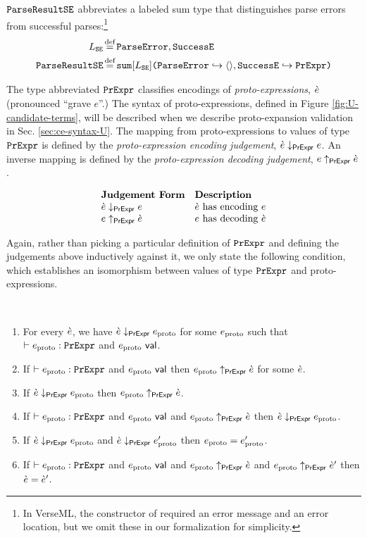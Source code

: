 \begin{enumerate}
$\mathtt{ParseResultSE}$ abbreviates a labeled sum type that distinguishes parse errors from successful parses:\footnote{In VerseML, the  constructor of  required an error message and an error location, but we omit these in our formalization for simplicity.}
\begin{align*}
L_\mathtt{SE} & \defeq \lbltxt{ParseError}, \lbltxt{SuccessE}\\
\tParseResultExp & \defeq \asum{\labelset_\mathtt{SE}}{
  \mapitem{\lbltxt{ParseError}}{\prodt{}}, 
  \mapitem{\lbltxt{SuccessE}}{\tCEExp}
}
\end{align*} %

The type abbreviated $\mathtt{PrExpr}$ classifies encodings of \emph{proto-expressions}, $\grave{e}$ (pronounced ``grave $e$''.) The syntax of proto-expressions, defined in Figure \ref{fig:U-candidate-terms}, will be described when we describe proto-expansion validation in Sec. \ref{sec:ce-syntax-U}. The mapping from proto-expressions to values of type $\mathtt{PrExpr}$ is defined by the \emph{proto-expression encoding judgement}, $\grave{e} \downarrow_\mathsf{PrExpr} e$. An inverse mapping is defined by the \emph{proto-expression decoding judgement}, $e \uparrow_\mathsf{PrExpr} \grave{e}$.

\[\begin{array}{ll}
\textbf{Judgement Form} & \textbf{Description}\\
\grave{e} \downarrow_\mathsf{PrExpr} e & \text{$\grave{e}$ has encoding $e$}\\
e \uparrow_\mathsf{PrExpr} \grave{e} & \text{$e$ has decoding $\grave{e}$}
\end{array}\]

Again, rather than picking a particular definition of $\mathtt{PrExpr}$ and defining the judgements above inductively against it, we only state the following condition, which establishes an isomorphism between values of type $\mathtt{PrExpr}$ and proto-expressions.

\begingroup 
\def\thetheorem{\ref{condition:proto-expression-isomorphism}}
\begin{condition} ~
\begin{enumerate}
\item For every $\grave{e}$, we have $\grave{e} \downarrow_\mathsf{PrExpr} e_\text{proto}$ for some $e_\text{proto}$ such that $\vdash e_\text{proto} : \mathtt{PrExpr}$ and $e_\text{proto}~\mathsf{val}$.
\item If $\vdash e_\text{proto} : \mathtt{PrExpr}$ and $e_\text{proto}~\mathsf{val}$ then $e_\text{proto} \uparrow_\mathsf{PrExpr} \grave{e}$ for some $\grave{e}$.
\item If $\grave{e} \downarrow_\mathsf{PrExpr} e_\text{proto}$ then $e_\text{proto} \uparrow_\mathsf{PrExpr} \grave{e}$.
\item If $\vdash e_\text{proto} : \mathtt{PrExpr}$ and $e_\text{proto}~\mathsf{val}$ and $e_\text{proto} \uparrow_\mathsf{PrExpr} \grave{e}$ then $\grave{e} \downarrow_\mathsf{PrExpr} e_\text{proto}$.
\item If $\grave{e} \downarrow_\mathsf{PrExpr} e_\text{proto}$ and $\grave{e} \downarrow_\mathsf{PrExpr} e_\text{proto}'$ then $e_\text{proto}=e_\text{proto}'$.
\item If $\vdash e_\text{proto} : \mathtt{PrExpr}$ and $e_\text{proto}~\mathsf{val}$ and $e_\text{proto} \uparrow_\mathsf{PrExpr} \grave{e}$ and $e_\text{proto} \uparrow_\mathsf{PrExpr} \grave{e}'$ then $\grave{e}=\grave{e}'$.
\end{enumerate}
\end{condition}
\endgroup


\end{enumerate}
